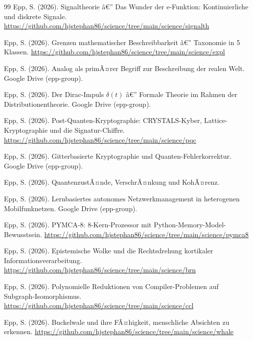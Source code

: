 ﻿\documentclass[a4paper,12pt]{article}
\theoremstyle{definition}
\begin{document}
\begin{thebibliography}{99}
Epp, S. (2026).
Signaltheorie â€” Das Wunder der e-Funktion: Kontinuierliche und diskrete Signale. \url{https://github.com/hjstephan86/science/tree/main/science/signalth}

Epp, S. (2026).
Grenzen mathematischer Beschreibbarkeit â€” Taxonomie in 5 Klassen. \url{https://github.com/hjstephan86/science/tree/main/science/expl}

Epp, S. (2026).
Analog als primÃ¤rer Begriff zur Beschreibung der realen Welt.
Google Drive (epp-group).

Epp, S. (2026).
Der Dirac-Impuls $\delta(t)$ â€” Formale Theorie im Rahmen der Distributionentheorie.
Google Drive (epp-group).

Epp, S. (2026).
Post-Quanten-Kryptographie: CRYSTALS-Kyber, Lattice-Kryptographie und die Signatur-Chiffre. \url{https://github.com/hjstephan86/science/tree/main/science/pqc}

Epp, S. (2026).
Gitterbasierte Kryptographie und Quanten-Fehlerkorrektur.
Google Drive (epp-group).

Epp, S. (2026).
QuantenzustÃ¤nde, VerschrÃ¤nkung und KohÃ¤renz.

Epp, S. (2026).
Lernbasiertes autonomes Netzwerkmanagement in heterogenen Mobilfunknetzen.
Google Drive (epp-group).

Epp, S. (2026).
PYMCA-8: 8-Kern-Prozessor mit Python-Memory-Model-Bewusstsein. \url{https://github.com/hjstephan86/science/tree/main/science/pymca8}

Epp, S. (2026).
Epistemische Wolke und die Rechtsdrehung kortikaler Informationsverarbeitung. \url{https://github.com/hjstephan86/science/tree/main/science/brn}

Epp, S. (2026).
Polynomielle Reduktionen von Compiler-Problemen auf Subgraph-Isomorphismus. \url{https://github.com/hjstephan86/science/tree/main/science/ccl}

Epp, S. (2026).
Buckelwale und ihre FÃ¤higkeit, menschliche Absichten zu erkennen. \url{https://github.com/hjstephan86/science/tree/main/science/whale}

\end{thebibliography}
\end{document}
